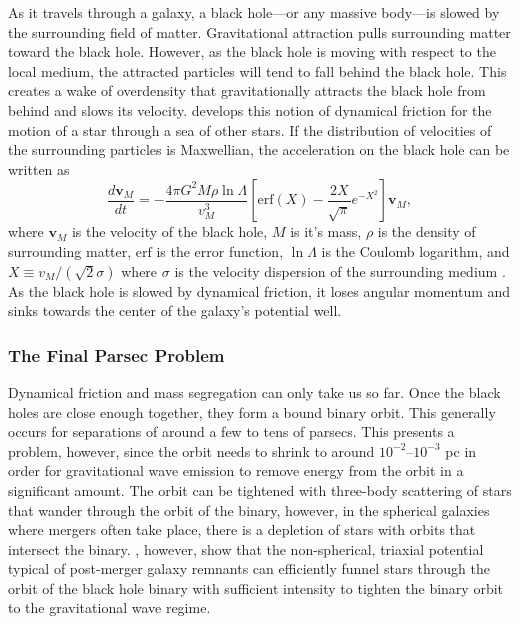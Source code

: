 As it travels through a galaxy, a black hole---or any massive body---is slowed by the surrounding field of matter.  Gravitational attraction pulls surrounding matter toward the black hole.  However, as the black hole is moving with respect to the local medium, the attracted particles will tend to fall behind the black hole.  This creates a wake of overdensity that gravitationally attracts the black hole from behind and slows its velocity.  \citet{chandrasekhar_1943} develops this notion of dynamical friction for the motion of a star through a sea of other stars.  If the distribution of velocities of the surrounding particles is Maxwellian, the acceleration on the black hole can be written as
\begin{equation} \label{eq:dynamical_friction}
  \frac{d\mathbf{v}_{M}}{dt} = - \frac{4 \pi G^{2} M \rho \ln \Lambda}{v_{M}^{3}} \left[ \textrm{erf}(X) - \frac{2X}{\sqrt{\pi}} e^{-X^{2}} \right] \mathbf{v}_{M},
\end{equation}
where $\mathbf{v}_{M}$ is the velocity of the black hole, $M$ is it's mass, $\rho$ is the density of surrounding matter, $\textrm{erf}$ is the error function, $\ln \Lambda$ is the Coulomb logarithm, and $X \equiv v_{M} / (\sqrt{2} \sigma)$ where $\sigma$ is the velocity dispersion of the surrounding medium \citep{binney_tremaine_1988}.  As the black hole is slowed by dynamical friction, it loses angular momentum and sinks towards the center of the galaxy's potential well.


\subsubsection{The Final Parsec Problem}

Dynamical friction and mass segregation can only take us so far.  Once the black holes are close enough together, they form a bound binary orbit.  This generally occurs for separations of around a few to tens of parsecs.  This presents a problem, however, since the orbit needs to shrink to around $10^{-2}$--$10^{-3}$ pc in order for gravitational wave emission to remove energy from the orbit in a significant amount.  The orbit can be tightened with three-body scattering of stars that wander through the orbit of the binary, however, in the spherical galaxies where mergers often take place, there is a depletion of stars with orbits that intersect the binary.  \citet{khan_2011}, however, show that the non-spherical, triaxial potential typical of post-merger galaxy remnants can efficiently funnel stars through the orbit of the black hole binary with sufficient intensity to tighten the binary orbit to the gravitational wave regime.


